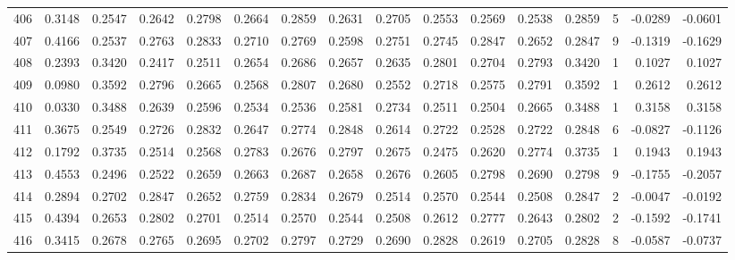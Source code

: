 \begin{tabular}{lrrrrrrrrrrrrrrr}
406 &      0.3148 &  0.2547 &  0.2642 &  0.2798 &  0.2664 &  0.2859 &  0.2631 &  0.2705 &  0.2553 &  0.2569 &   0.2538 &     0.2859 &      5 &                   -0.0289 &                    -0.0601 \\
407 &      0.4166 &  0.2537 &  0.2763 &  0.2833 &  0.2710 &  0.2769 &  0.2598 &  0.2751 &  0.2745 &  0.2847 &   0.2652 &     0.2847 &      9 &                   -0.1319 &                    -0.1629 \\
408 &      0.2393 &  0.3420 &  0.2417 &  0.2511 &  0.2654 &  0.2686 &  0.2657 &  0.2635 &  0.2801 &  0.2704 &   0.2793 &     0.3420 &      1 &                    0.1027 &                     0.1027 \\
409 &      0.0980 &  0.3592 &  0.2796 &  0.2665 &  0.2568 &  0.2807 &  0.2680 &  0.2552 &  0.2718 &  0.2575 &   0.2791 &     0.3592 &      1 &                    0.2612 &                     0.2612 \\
410 &      0.0330 &  0.3488 &  0.2639 &  0.2596 &  0.2534 &  0.2536 &  0.2581 &  0.2734 &  0.2511 &  0.2504 &   0.2665 &     0.3488 &      1 &                    0.3158 &                     0.3158 \\
411 &      0.3675 &  0.2549 &  0.2726 &  0.2832 &  0.2647 &  0.2774 &  0.2848 &  0.2614 &  0.2722 &  0.2528 &   0.2722 &     0.2848 &      6 &                   -0.0827 &                    -0.1126 \\
412 &      0.1792 &  0.3735 &  0.2514 &  0.2568 &  0.2783 &  0.2676 &  0.2797 &  0.2675 &  0.2475 &  0.2620 &   0.2774 &     0.3735 &      1 &                    0.1943 &                     0.1943 \\
413 &      0.4553 &  0.2496 &  0.2522 &  0.2659 &  0.2663 &  0.2687 &  0.2658 &  0.2676 &  0.2605 &  0.2798 &   0.2690 &     0.2798 &      9 &                   -0.1755 &                    -0.2057 \\
414 &      0.2894 &  0.2702 &  0.2847 &  0.2652 &  0.2759 &  0.2834 &  0.2679 &  0.2514 &  0.2570 &  0.2544 &   0.2508 &     0.2847 &      2 &                   -0.0047 &                    -0.0192 \\
415 &      0.4394 &  0.2653 &  0.2802 &  0.2701 &  0.2514 &  0.2570 &  0.2544 &  0.2508 &  0.2612 &  0.2777 &   0.2643 &     0.2802 &      2 &                   -0.1592 &                    -0.1741 \\
416 &      0.3415 &  0.2678 &  0.2765 &  0.2695 &  0.2702 &  0.2797 &  0.2729 &  0.2690 &  0.2828 &  0.2619 &   0.2705 &     0.2828 &      8 &                   -0.0587 &                    -0.0737 \\

\end{tabular}
